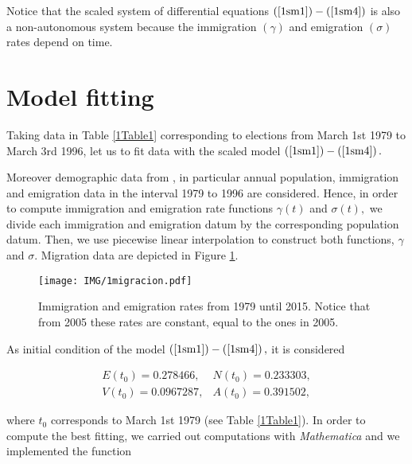 Notice that the scaled system of differential equations $\left( \ref{1sm1}
\right) -\left( \ref{1sm4}\right) $ is also a non-autonomous system because
the immigration $\left( \gamma \right) $ and emigration $\left( \sigma
\right) $ rates depend on time.

\section{Model fitting}\label{1.4}

Taking data in Table \ref{1Table1} corresponding to elections from March 1st
1979 to March 3rd 1996, let us to fit data with the scaled model 
$\left( \ref{1sm1}\right) -\left( \ref{1sm4}\right).$

Moreover demographic data from \cite{demogPV}, in particular annual
population, immigration and emigration data in the interval 1979 to 1996 are
considered. Hence, in order to compute immigration and emigration rate
functions $\gamma \left( t\right) $ and $\sigma \left( t\right),$ we divide
each immigration and emigration datum by the corresponding population datum.
Then, we use piecewise linear interpolation to construct both functions, $\gamma$ and 
$\sigma $. Migration data are depicted in Figure \ref{1migra}.

\begin{figure}[htb]
\begin{center}
\texttt{[image: IMG/1migracion.pdf]}
\end{center}
\caption{Immigration and emigration rates from 1979 until 2015. Notice that from 2005 these rates are constant, equal to the ones in 2005.}
\label{1migra}
\end{figure} 

As initial condition of the model $\left( \ref{1sm1}\right) -\left(\ref{1sm4}\right),$ 
it is considered

\begin{equation}
\begin{array}{cc}
E\left( t_{0}\right) =0.278466, & N\left( t_{0}\right) =0.233303, \\ 
V\left( t_{0}\right) =0.0967287, & A\left( t_{0}\right) =0.391502,
\end{array}
\label{1IC}
\end{equation}

where $t_{0}$ corresponds to March 1st 1979 (see Table \ref{1Table1}). In
order to compute the best fitting, we carried out computations with 
\emph{Mathematica} \cite{Wolfram} and we implemented the function

